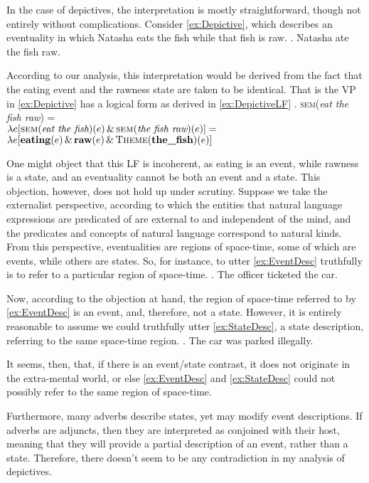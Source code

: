 \documentclass[MilwayThesis]{subfiles}
\begin{document}
In the case of depictives, the interpretation is mostly straightforward, though not entirely without complications.
Consider \cref{ex:Depictive}, which describes an eventuality in which Natasha eats the fish while that fish is raw.
\ex. Natasha ate the fish raw.\label{ex:Depictive}

According to our analysis, this interpretation would be derived from the fact that the eating event and the rawness state are taken to be identical.
That is the VP in \cref{ex:Depictive} has a logical form  as derived in \cref{ex:DepictiveLF}
\ex. \textsc{sem}(\textit{eat the fish raw}) =\\
$\lambda e [\textsc{sem}(\textit{eat the fish})(e) \, \&\, \textsc{sem}(\textit{the fish raw})(e)] =$\\
$\lambda e [\textbf{eating}(e)\, \&\, \textbf{raw}(e)\, \&\, \textsc{Theme}(\textbf{the\_fish})(e)]$\label{ex:DepictiveLF}

One might object that this LF is incoherent, as eating is an event, while rawness is a state, and an eventuality cannot be both an event and a state.
This objection, however, does not hold up under scrutiny.
Suppose we take the externalist perspective, according to which the entities that natural language expressions are predicated of are external to and independent of the mind, and the predicates and concepts of natural language correspond to natural kinds.
From this perspective, eventualities are regions of space-time, some of which are events, while others are states.
So, for instance, to utter \cref{ex:EventDesc} truthfully is to refer to a particular region of space-time.
\ex.\label{ex:EventDesc} The officer ticketed the car.

Now, according to the objection at hand, the region of space-time referred to by \cref{ex:EventDesc} is an event, and, therefore, not a state.
However, it is entirely reasonable to assume we could truthfully utter \cref{ex:StateDesc}, a state description, referring to the same space-time region.
\ex.\label{ex:StateDesc} The car was parked illegally.

It seems, then, that, if there is an event/state contrast, it does not originate in the extra-mental world, or else \cref{ex:EventDesc} and \cref{ex:StateDesc} could not possibly refer to the same region of space-time.

Furthermore, many adverbs describe states, yet may modify event descriptions.
If adverbs are adjuncts, then they are interpreted as conjoined with their host, meaning that they will provide a partial description of an event, rather than a state.
Therefore, there doesn't seem to be any contradiction in my analysis of depictives.
\end{document}
